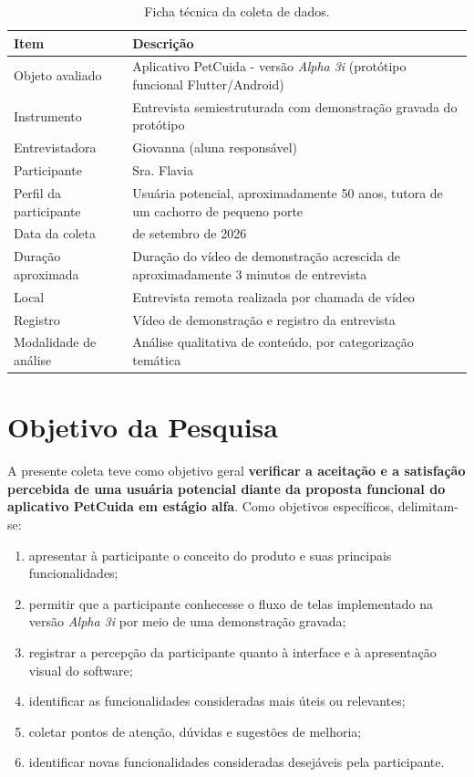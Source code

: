 \documentclass[12pt,a4paper]{article}
\newcommand{\entrevistador}{Giovanna}
\newcommand{\participante}{Sra. Flavia}
\begin{document}
\begin{table}[h!]
\centering
\begin{tabular}{@{}>{\raggedright\arraybackslash}p{5.2cm}>{\raggedright\arraybackslash}p{8.5cm}@{}}
\toprule
\textbf{Item} & \textbf{Descrição} \\
\midrule
Objeto avaliado & Aplicativo PetCuida - versão \textit{Alpha 3i} (protótipo funcional Flutter/Android) \\
Instrumento & Entrevista semiestruturada com demonstração gravada do protótipo \\
Entrevistadora & \entrevistador{} (aluna responsável) \\
Participante & \participante{} \\
Perfil da participante & Usuária potencial, aproximadamente 50 anos, tutora de um cachorro de pequeno porte \\
Data da coleta & 16 de setembro de 2026 \\
Duração aproximada & Duração do vídeo de demonstração acrescida de aproximadamente 3 minutos de entrevista \\
Local & Entrevista remota realizada por chamada de vídeo \\
Registro & Vídeo de demonstração e registro da entrevista \\
Modalidade de análise & Análise qualitativa de conteúdo, por categorização temática \\
\bottomrule
\end{tabular}
\caption{Ficha técnica da coleta de dados.}
\end{table}

\section{Objetivo da Pesquisa}

A presente coleta teve como objetivo geral \textbf{verificar a aceitação e a satisfação
percebida de uma usuária potencial diante da proposta funcional do aplicativo PetCuida em
estágio alfa}. Como objetivos específicos, delimitam-se:

\begin{enumerate}[label=\alph*)]
  \item apresentar à participante o conceito do produto e suas principais funcionalidades;
  \item permitir que a participante conhecesse o fluxo de telas implementado na versão
        \textit{Alpha 3i} por meio de uma demonstração gravada;
  \item registrar a percepção da participante quanto à interface e à apresentação visual
        do software;
  \item identificar as funcionalidades consideradas mais úteis ou relevantes;
  \item coletar pontos de atenção, dúvidas e sugestões de melhoria;
  \item identificar novas funcionalidades consideradas desejáveis pela participante.
\end{enumerate}
\end{document}
